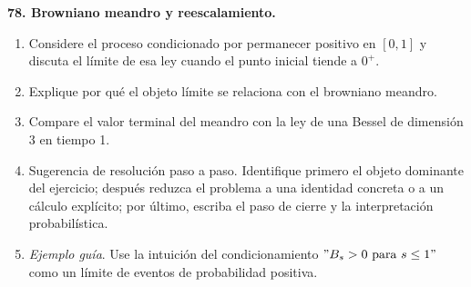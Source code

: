 \documentclass[11pt, letterpaper]{article}
\begin{document}
\newpage
\begin{ejercicio}
    \textbf{78. Browniano meandro y reescalamiento.}
    \begin{enumerate}
        \item Considere el proceso condicionado por permanecer positivo en $[0, 1]$ y discuta el límite de esa ley cuando el punto inicial tiende a $0^{+}$.
        \item Explique por qué el objeto límite se relaciona con el browniano meandro.
        \item Compare el valor terminal del meandro con la ley de una Bessel de dimensión 3 en tiempo 1.
        \item Sugerencia de resolución paso a paso. Identifique primero el objeto dominante del ejercicio; después reduzca el problema a una identidad concreta o a un cálculo explícito; por último, escriba el paso de cierre y la interpretación probabilística.
        \item \textit{Ejemplo guía}. Use la intuición del condicionamiento $"B_{s}>0 \text{ para } s\le 1"$ como un límite de eventos de probabilidad positiva.
    \end{enumerate}
\end{ejercicio}

\vspace{5mm}
\end{document}
